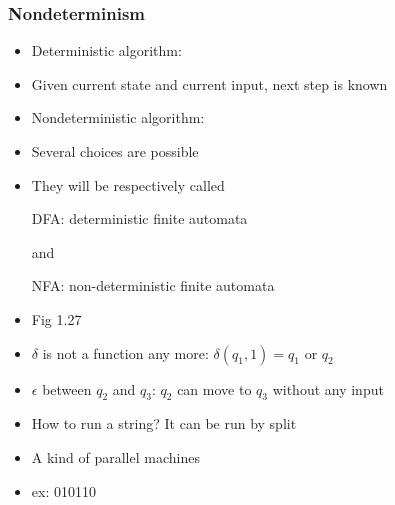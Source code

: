 




\begin{frame}[allowframebreaks] \frametitle{Nondeterminism}
  \begin{itemize}
\item Deterministic algorithm:

\item [] Given current state and current input, next step is known
\item Nondeterministic algorithm:

\item [] Several choices are possible
  
\item They will be respectively called
  \begin{center}
  DFA: deterministic finite automata
\end{center}
  and
  \begin{center}
  NFA: non-deterministic finite automata
\end{center}
\item Fig 1.27

\begin{center}
    \end{center}
  
  \item $\delta$ is not a function any more: $\delta(q_1, 1) = q_1
$ or $q_2$

\item $\epsilon$ between $q_2$ and $q_3$: $q_2$ can move to
$q_3$ without any input
\item How to run a string? It can be run by split

\item A kind of parallel machines
\item ex: 010110


\end{itemize}
\end{frame}
